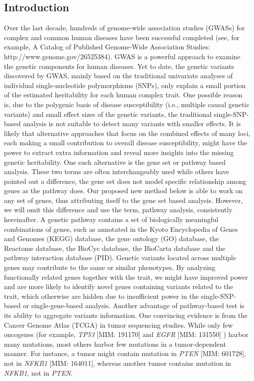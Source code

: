 \documentclass[12pt]{article}
\begin{document}
\newpage
\subsection{Introduction}
Over the last decade, hundreds of genome-wide association studies (GWASs) for complex and common human diseases have been successful completed (see, for example, A Catalog of Published Genome-Wide Association Studies: http://www.genome.gov/26525384). GWAS is a powerful approach to examine the genetic components for human diseases. Yet to date, the genetic variants discovered by GWAS, mainly based on the traditional univariate analyses of individual single-nucleotide polymorphisms (SNPs), only explain a small portion of the estimated heritability for each human complex trait. One possible reason is, due to the polygenic basis of disease susceptibility (i.e., multiple causal genetic variants) and small effect sizes of the genetic variants, the traditional single-SNP-based analysis is not suitable to detect many variants with smaller effects. It is likely that alternative approaches that focus on the combined effects of many loci, each making a small contribution to overall disease susceptibility, might have the power to extract extra information and reveal more insights into the missing genetic heritability. One such alternative is the gene set or pathway based analysis. These two terms are often interchangeably used while others have pointed out a difference, the gene set does not model specific relationship among genes as the pathway does.\cite{Fridley2011} Our proposed new method below is able to work on any set of genes, thus attributing itself to the gene set based analysis. However, we will omit this difference and use the term, pathway analysis, consistently hereinafter. A genetic pathway contains a set of biologically meaningful combinations of genes, such as annotated in the Kyoto Encyclopedia of Genes and Genomes (KEGG) database,\cite{Ogata1999} the gene ontology (GO) database,\cite{Ashburner2000} the Reactome database,\cite{Joshi-Tope2005} the BioCyc database,\cite{Caspi2008} the BioCarta database\cite{Nishimura2001} and the pathway interaction database (PID).\cite{Schaefer2009} Genetic variants located across multiple genes may contribute to the same or similar phenotypes. By analyzing functionally related genes together with the trait, we might have improved power and are more likely to identify novel genes containing variants related to the trait, which otherwise are hidden due to insufficient power in the single-SNP-based or single-gene-based analysis.\cite{BloodPressureGenome-WideAssociationStudies2011,Hirschhorn2009,Zhong2010,Wang2010,Holmans2009a} Another advantage of pathway-based test is its ability to aggregate variants information. One convincing evidence is from the Cancer Genome Atlas  (TCGA)\cite{Network2011} in tumor sequencing studies. While only few oncogenes (for example, \textit{TP53} [MIM: 191170] and \textit{EGFR} [MIM: 131550] ) harbor many mutations, most others harbor few mutations in a tumor-dependent manner. For instance, a tumor might contain mutation in \textit{PTEN} [MIM: 601728], not in \textit{NFKB1} [MIM: 164011], whereas another tumor contains mutation in \textit{NFKB1}, not in \textit{PTEN}. 
\end{document}
